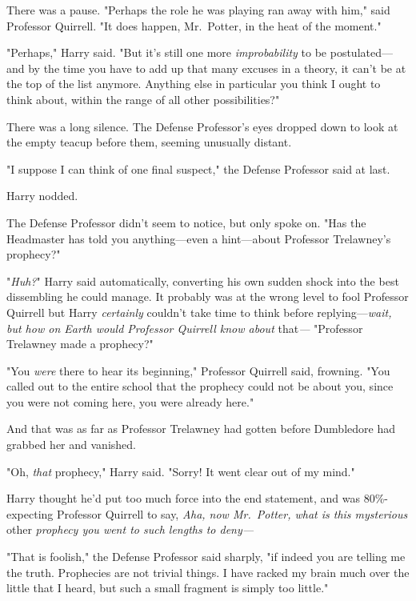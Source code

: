 There was a pause. "Perhaps the role he was playing ran away with him," said
Professor Quirrell. "It does happen, Mr.~Potter, in the heat of the moment."

"Perhaps," Harry said. "But it's still one more \emph{improbability} to be
postulated---and by the time you have to add up that many excuses in a theory,
it can't be at the top of the list anymore. Anything else in particular you
think I ought to think about, within the range of all other possibilities?"

There was a long silence. The Defense Professor's eyes dropped down to look at
the empty teacup before them, seeming unusually distant.

"I suppose I can think of one final suspect," the Defense Professor said at
last.

Harry nodded.

The Defense Professor didn't seem to notice, but only spoke on. "Has the
Headmaster has told you anything---even a hint---about Professor Trelawney's
prophecy?"

"\emph{Huh?}" Harry said automatically, converting his own sudden shock into
the best dissembling he could manage. It probably was at the wrong level to
fool Professor Quirrell but Harry \emph{certainly} couldn't take time to think
before replying---\emph{wait, but how on Earth would Professor Quirrell know
about} that\emph{---} "Professor Trelawney made a prophecy?"

"You \emph{were} there to hear its beginning," Professor Quirrell said,
frowning. "You called out to the entire school that the prophecy could not be
about you, since you were not coming here, you were already here."


And that was as far as Professor Trelawney had gotten before Dumbledore had
grabbed her and vanished.

"Oh, \emph{that} prophecy," Harry said. "Sorry! It went clear out of my mind."

Harry thought he'd put too much force into the end statement, and was
80\%-expecting Professor Quirrell to say, \emph{Aha, now Mr.~Potter, what is
this mysterious} other \emph{prophecy you went to such lengths to deny---}

"That is foolish," the Defense Professor said sharply, "if indeed you are
telling me the truth. Prophecies are not trivial things. I have racked my brain
much over the little that I heard, but such a small fragment is simply too
little."

